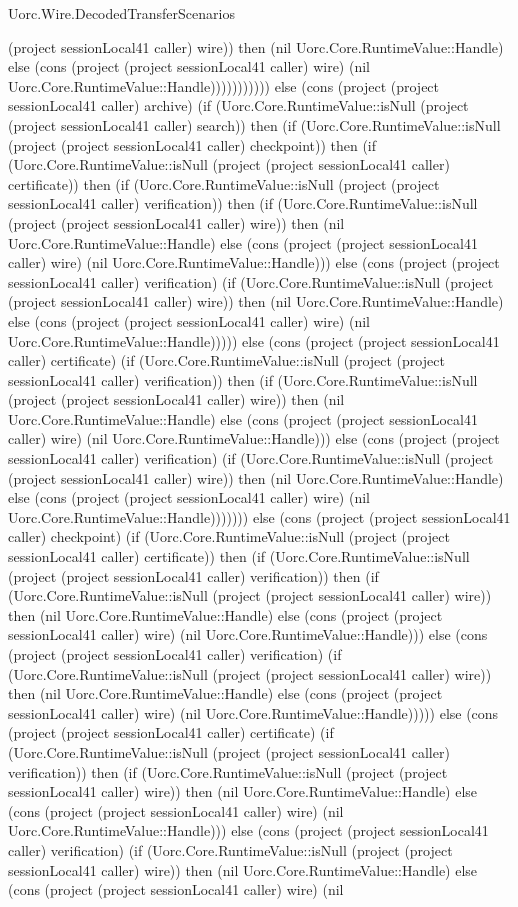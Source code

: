\begin{lexlean}{Uorc.Wire.DecodedTransferScenarios}
\begin{semanticmodule}
{(project sessionLocal41 caller) wire)) then (nil Uorc.Core.RuntimeValue::Handle) else (cons (project (project sessionLocal41 caller) wire) (nil Uorc.Core.RuntimeValue::Handle))))))))))) else (cons (project (project sessionLocal41 caller) archive) (if (Uorc.Core.RuntimeValue::isNull (project (project sessionLocal41 caller) search)) then (if (Uorc.Core.RuntimeValue::isNull (project (project sessionLocal41 caller) checkpoint)) then (if (Uorc.Core.RuntimeValue::isNull (project (project sessionLocal41 caller) certificate)) then (if (Uorc.Core.RuntimeValue::isNull (project (project sessionLocal41 caller) verification)) then (if (Uorc.Core.RuntimeValue::isNull (project (project sessionLocal41 caller) wire)) then (nil Uorc.Core.RuntimeValue::Handle) else (cons (project (project sessionLocal41 caller) wire) (nil Uorc.Core.RuntimeValue::Handle))) else (cons (project (project sessionLocal41 caller) verification) (if (Uorc.Core.RuntimeValue::isNull (project (project sessionLocal41 caller) wire)) then (nil Uorc.Core.RuntimeValue::Handle) else (cons (project (project sessionLocal41 caller) wire) (nil Uorc.Core.RuntimeValue::Handle))))) else (cons (project (project sessionLocal41 caller) certificate) (if (Uorc.Core.RuntimeValue::isNull (project (project sessionLocal41 caller) verification)) then (if (Uorc.Core.RuntimeValue::isNull (project (project sessionLocal41 caller) wire)) then (nil Uorc.Core.RuntimeValue::Handle) else (cons (project (project sessionLocal41 caller) wire) (nil Uorc.Core.RuntimeValue::Handle))) else (cons (project (project sessionLocal41 caller) verification) (if (Uorc.Core.RuntimeValue::isNull (project (project sessionLocal41 caller) wire)) then (nil Uorc.Core.RuntimeValue::Handle) else (cons (project (project sessionLocal41 caller) wire) (nil Uorc.Core.RuntimeValue::Handle))))))) else (cons (project (project sessionLocal41 caller) checkpoint) (if (Uorc.Core.RuntimeValue::isNull (project (project sessionLocal41 caller) certificate)) then (if (Uorc.Core.RuntimeValue::isNull (project (project sessionLocal41 caller) verification)) then (if (Uorc.Core.RuntimeValue::isNull (project (project sessionLocal41 caller) wire)) then (nil Uorc.Core.RuntimeValue::Handle) else (cons (project (project sessionLocal41 caller) wire) (nil Uorc.Core.RuntimeValue::Handle))) else (cons (project (project sessionLocal41 caller) verification) (if (Uorc.Core.RuntimeValue::isNull (project (project sessionLocal41 caller) wire)) then (nil Uorc.Core.RuntimeValue::Handle) else (cons (project (project sessionLocal41 caller) wire) (nil Uorc.Core.RuntimeValue::Handle))))) else (cons (project (project sessionLocal41 caller) certificate) (if (Uorc.Core.RuntimeValue::isNull (project (project sessionLocal41 caller) verification)) then (if (Uorc.Core.RuntimeValue::isNull (project (project sessionLocal41 caller) wire)) then (nil Uorc.Core.RuntimeValue::Handle) else (cons (project (project sessionLocal41 caller) wire) (nil Uorc.Core.RuntimeValue::Handle))) else (cons (project (project sessionLocal41 caller) verification) (if (Uorc.Core.RuntimeValue::isNull (project (project sessionLocal41 caller) wire)) then (nil Uorc.Core.RuntimeValue::Handle) else (cons (project (project sessionLocal41 caller) wire) (nil }
\end{semanticmodule}
\end{lexlean}
